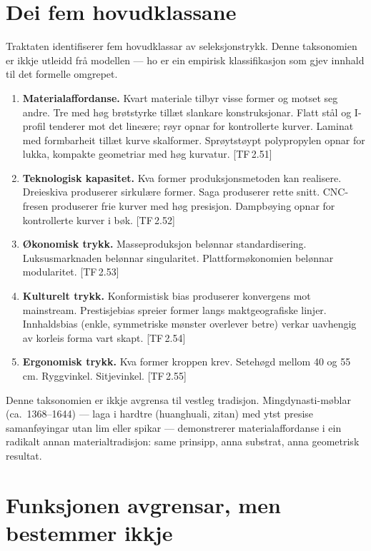 \documentclass[10pt]{book}
\theoremstyle{definition}
\theoremstyle{plain}
\theoremstyle{remark}
\newcommand{\TF}[1]{\textnormal{[TF\,#1]}}
\begin{document}
\section{Dei fem hovudklassane}\label{sec:seleksjon:klassar}

Traktaten identifiserer fem hovudklassar av seleksjonstrykk. Denne taksonomien er ikkje utleidd fr\aa{} modellen --- ho er ein empirisk klassifikasjon som gjev innhald til det formelle omgrepet.

\begin{enumerate}[label=\textbf{\arabic*.}]
  \item \textbf{Materialaffordanse.} Kvart materiale tilbyr visse former og motset seg andre. Tre med h\o g br\o tstyrke till\ae t slankare konstruksjonar. Flatt st\aa l og I-profil tenderer mot det line\ae re; r\o yr opnar for kontrollerte kurver. Laminat med formbarheit till\ae t kurve skalformer. Spr\o ytst\o ypt polypropylen opnar for lukka, kompakte geometriar med h\o g kurvatur. \TF{2.51}
  \item \textbf{Teknologisk kapasitet.} Kva former produksjonsmetoden kan realisere. Dreieskiva produserer sirkul\ae re former. Saga produserer rette snitt. CNC-fresen produserer frie kurver med h\o g presisjon. Dampb\o ying opnar for kontrollerte kurver i b\o k. \TF{2.52}
  \item \textbf{\O konomisk trykk.} Masseproduksjon bel\o nnar standardisering. Luksusmarknaden bel\o nnar singularitet. Plattform\o konomien bel\o nnar modularitet. \TF{2.53}
  \item \textbf{Kulturelt trykk.} Konformistisk bias produserer konvergens mot mainstream. Prestisjebias spreier former langs maktgeografiske linjer. Innhaldsbias (enkle, symmetriske m\o nster overlever betre) verkar uavhengig av korleis forma vart skapt. \TF{2.54}
  \item \textbf{Ergonomisk trykk.} Kva former kroppen krev. Seteh\o gd mellom 40 og 55\,cm. Ryggvinkel. Sitjevinkel. \TF{2.55}
\end{enumerate}

Denne taksonomien er ikkje avgrensa til vestleg tradisjon. Mingdynasti-m\o blar (ca.~1368--1644) --- laga i hardtre (huanghuali, zitan) med ytst presise samanf\o yingar utan lim eller spikar --- demonstrerer materialaffordanse i ein radikalt annan materialtradisjon: same prinsipp, anna substrat, anna geometrisk resultat.

\section{Funksjonen avgrensar, men bestemmer ikkje}\label{sec:seleksjon:funksjon}
\end{document}

